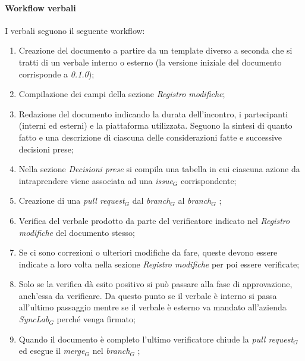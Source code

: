     \paragraph{Workflow verbali}
    I verbali seguono il seguente workflow:
    \begin{enumerate}
        \item Creazione del documento a partire da un template diverso a seconda che si tratti di un verbale interno o esterno (la versione iniziale del documento corrisponde a \textit{0.1.0});
        \item Compilazione dei campi della sezione \textit{Registro modifiche};
        \item Redazione del documento indicando la durata dell'incontro, i partecipanti (interni ed esterni) e la piattaforma utilizzata. Seguono la sintesi di quanto fatto e una descrizione di ciascuna 
        delle considerazioni fatte e successive decisioni prese;
        \item Nella sezione \textit{Decisioni prese} si compila una 
        tabella in cui ciascuna azione da intraprendere viene associata 
        ad una \textit{issue}$_G$ corrispondente;
        \item Creazione di una \textit{pull request}$_G$ dal \textit{branch}$_G$  al \textit{branch}$_G$ ;
        \item Verifica del verbale prodotto da parte del verificatore 
        indicato nel \textit{Registro modifiche} del documento stesso;
        \item Se ci sono correzioni o ulteriori modifiche da fare, queste 
        devono essere indicate a loro volta nella sezione \textit{Registro modifiche} per poi essere verificate;
        \item Solo se la verifica dà esito positivo si può passare alla fase di approvazione, anch'essa da verificare. \newline Da questo punto se il verbale è interno si passa all'ultimo passaggio mentre se il verbale è esterno va mandato all'azienda \textit{SyncLab}$_G$ perché venga firmato;
        \item Quando il documento è completo l'ultimo verificatore 
        chiude la \textit{pull request}$_G$ ed esegue il \textit{merge}$_G$ nel \textit{branch}$_G$ ;
    \end{enumerate}

